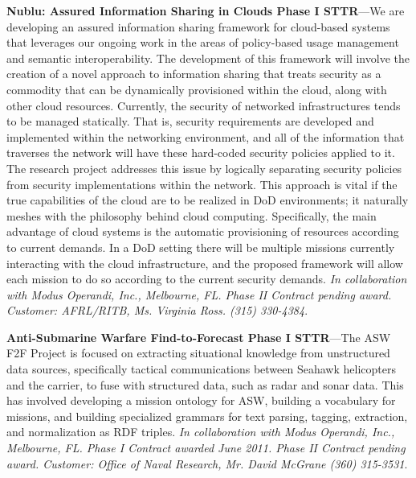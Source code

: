 \documentclass{sbir}
\begin{document}
{\bf Nublu: Assured Information Sharing in Clouds Phase I STTR}---We are developing an assured information sharing framework for cloud-based systems that leverages our ongoing work in the areas of policy-based usage management and semantic interoperability. The development of this framework will involve the creation of a novel approach to information sharing that treats security as a commodity that can be dynamically provisioned within the cloud, along with other cloud resources. Currently, the security of networked infrastructures tends to be managed statically. That is, security requirements are developed and implemented within the networking environment, and all of the information that traverses the network will have these hard-coded security policies applied to it. The research project addresses this issue by logically separating security policies from security implementations within the network. This approach is vital if the true capabilities of the cloud are to be realized in DoD environments; it naturally meshes with the philosophy behind cloud computing. Specifically, the main advantage of cloud systems is the automatic provisioning of resources according to current demands. In a DoD setting there will be multiple missions currently interacting with the cloud infrastructure, and the proposed framework will allow each mission to do so according to the current security demands. \emph{In collaboration with Modus Operandi, Inc., Melbourne, FL. Phase II Contract pending award. Customer: AFRL/RITB, Ms. Virginia Ross. (315) 330-4384}.

{\bf Anti-Submarine Warfare Find-to-Forecast Phase I STTR}---The ASW F2F Project is focused on extracting situational knowledge from unstructured data sources, specifically tactical communications between Seahawk helicopters and the carrier, to fuse with structured data, such as radar and sonar data. This has involved developing a mission ontology for ASW, building a vocabulary for missions, and building specialized grammars for text parsing, tagging, extraction, and normalization as RDF triples. \emph{In collaboration with Modus Operandi, Inc., Melbourne, FL. Phase I Contract awarded June 2011. Phase II Contract pending award. Customer: Office of Naval Research, Mr. David McGrane (360) 315-3531}.
\end{document}
